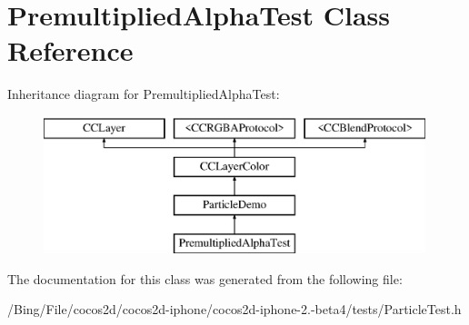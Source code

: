 \hypertarget{interface_premultiplied_alpha_test}{\section{Premultiplied\-Alpha\-Test Class Reference}
\label{interface_premultiplied_alpha_test}
}
Inheritance diagram for Premultiplied\-Alpha\-Test\-:\begin{figure}[H]
\begin{center}
\leavevmode
\includegraphics[height=4.000000cm]{interface_premultiplied_alpha_test}
\end{center}
\end{figure}


The documentation for this class was generated from the following file\-:\begin{DoxyCompactItemize}
\item 
/\-Bing/\-File/cocos2d/cocos2d-\/iphone/cocos2d-\/iphone-\/2.-\/beta4/tests/Particle\-Test.\-h\end{DoxyCompactItemize}
